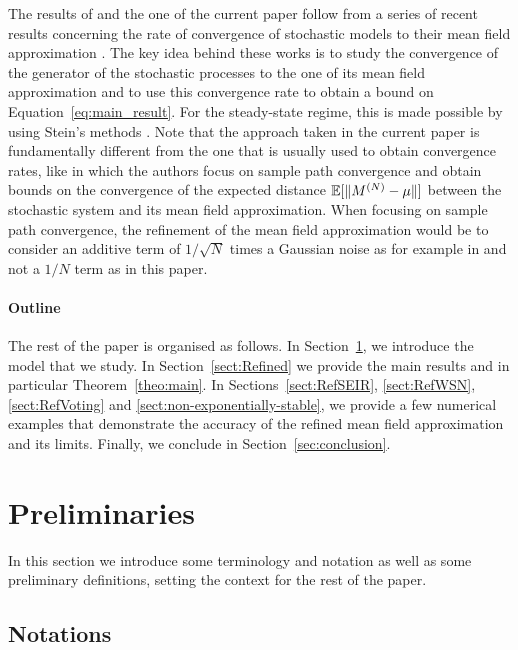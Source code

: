 \documentclass{amsart}
\begin{document}
The results of \cite{gast2017refined} and the one of the current paper
follow from a series of recent results concerning the rate of
convergence of stochastic models to their mean field approximation
\cite{gast2017expected,ying2016rate,ying2017stein,kolokoltsov2011mean}. The
key idea behind these works is to study the convergence of the
generator of the stochastic processes to the one of its mean field
approximation and to use this convergence rate to obtain a bound on
Equation~\eqref{eq:main_result}.  For the steady-state regime, this is
made possible by using Stein's methods
\cite{stein1986approximate,braverman2017stein,braverman2017stein2}.
Note that the approach taken in the current paper is fundamentally
different from the one that is usually used to obtain convergence
rates, like \cite{gast2012markov,bortolussi2013bounds,gastgaujalDEDS}
in which the authors focus on sample path convergence and obtain
bounds on the convergence of the expected distance
$\esp{\norm{\MN-\mu}}$ between the stochastic system and its mean
field approximation. When focusing on sample path convergence, the
refinement of the mean field approximation would be to consider an
additive term of $1/\sqrt{N}$ times a Gaussian noise as for example in
\cite{gast2012markov} and not a $1/N$ term as in this paper.

\paragraph*{Outline} The rest of the paper is organised as follows. In
Section~\ref{sect:preliminaries}, we introduce the model that we
study. In Section~\ref{sect:Refined} we provide the main results and
in particular Theorem~\ref{theo:main}. In Sections~\ref{sect:RefSEIR},
\ref{sect:RefWSN}, \ref{sect:RefVoting} and
\ref{sect:non-exponentially-stable}, we provide a few numerical
examples that demonstrate the accuracy of the refined mean field
approximation and its limits. Finally, we conclude in
Section~\ref{sec:conclusion}.

\section{Preliminaries}
\label{sect:preliminaries}

In this section we introduce some terminology and notation as well as
some preliminary definitions, setting the context for the rest of the
paper.


\subsection{Notations}
\end{document}
